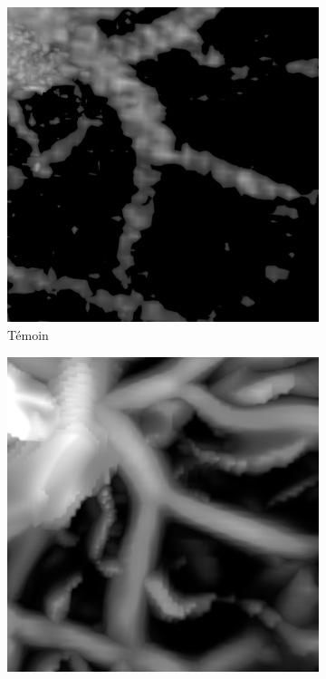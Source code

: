 \begin{figure}[!ht]
\begin{subfigure}[t]{0.30\textwidth}
        \includegraphics[clip = true, trim  = 0 50 0 80, width=\textwidth]{Images/Ircad_k_Baseline.png}
        \caption{Témoin}
      \end{subfigure}
      \begin{subfigure}[t]{0.30\textwidth}
        \includegraphics[clip = true, trim  = 0 50 0 80, width=\textwidth]{Images/Ircad_k_Frangi.png}

\end{subfigure}
\end{figure}
